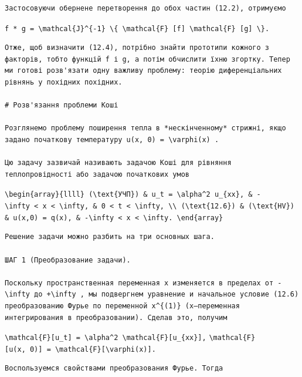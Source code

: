 \documentclass[
  ukrainian,
]{article}
\begin{document}
\begin{verbatim}
Застосовуючи обернене перетворення до обох частин (12.2), отримуємо
\end{verbatim}

\texttt{f\ *\ g\ =\ \textbackslash{}mathcal\{J\}\^{}\{-1\}\ \textbackslash{}\{\ \textbackslash{}mathcal\{F\}\ {[}f{]}\ \textbackslash{}mathcal\{F\}\ {[}g{]}\ \textbackslash{}\}.}

\begin{verbatim}
Отже, щоб визначити (12.4), потрібно знайти прототипи кожного з факторів, тобто функцій f і g, а потім обчислити їхню згортку. Тепер ми готові розв'язати одну важливу проблему: теорію диференціальних рівнянь у похідних похідних.

# Розв'язання проблеми Коші

Розглянемо проблему поширення тепла в *нескінченному* стрижні, якщо задано початкову температуру u(x, 0) = \varphi(x) .

Цю задачу зазвичай називають задачою Коші для рівняння теплопровідності або задачою початкових умов
\end{verbatim}

\texttt{\textbackslash{}begin\{array\}\{llll\}\ (\textbackslash{}text\{УЧП\})\ \&\ u\_t\ =\ \textbackslash{}alpha\^{}2\ u\_\{xx\},\ \&\ -\textbackslash{}infty\ \textless{}\ x\ \textless{}\ \textbackslash{}infty,\ \&\ 0\ \textless{}\ t\ \textless{}\ \textbackslash{}infty,\ \textbackslash{}\textbackslash{}\ (\textbackslash{}text\{12.6\})\ \&\ (\textbackslash{}text\{HV\})\ \&\ u(x,0)\ =\ q(x),\ \&\ -\textbackslash{}infty\ \textless{}\ x\ \textless{}\ \textbackslash{}infty.\ \textbackslash{}end\{array\}}

\begin{verbatim}
Решение задачи можно разбить на три основных шага.

ШАГ 1 (Преобразование задачи).

Поскольку пространственная переменная x изменяется в пределах от -\infty до +\infty , мы подвергнем уравнение и начальное условие (12.6) преобразованию Фурье по переменной x^{(1)} (x—переменная интегрирования в преобразовании). Сделав это, получим
\end{verbatim}

\texttt{\textbackslash{}mathcal\{F\}{[}u\_t{]}\ =\ \textbackslash{}alpha\^{}2\ \textbackslash{}mathcal\{F\}{[}u\_\{xx\}{]},}
\texttt{\textbackslash{}mathcal\{F\}{[}u(x,\ 0){]}\ =\ \textbackslash{}mathcal\{F\}{[}\textbackslash{}varphi(x){]}.}

\begin{verbatim}
Воспользуемся свойствами преобразования Фурье. Тогда
\end{verbatim}
\end{document}
